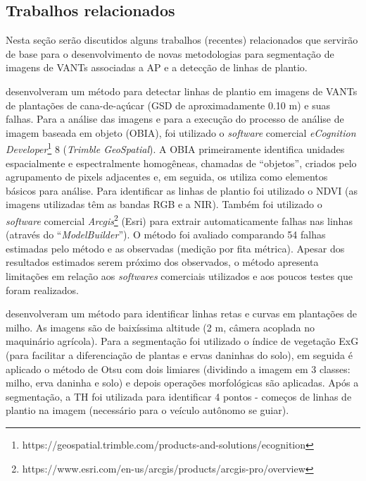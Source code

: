 \documentclass[12pt, a4paper, english, brazil]{article}
\newcommand{\dotsBlue}{\colorbox{orange}{\textcolor{blue}{\dots}}}
\begin{document}


\subsection{Trabalhos relacionados}

Nesta seção serão discutidos alguns trabalhos (recentes) relacionados que servirão de base para o desenvolvimento de novas metodologias para segmentação de imagens de VANTs associadas a AP e a detecção de linhas de plantio.

 desenvolveram um método para detectar linhas de plantio em imagens de VANTs de plantações de cana-de-açúcar (GSD de aproximadamente 0.10 m) e suas falhas. Para a análise das imagens e para a execução do processo de análise de imagem baseada em objeto (OBIA), foi utilizado o \textit{software} comercial \textit{eCognition Developer}\footnote{https://geospatial.trimble.com/products-and-solutions/ecognition} 8 (\textit{Trimble GeoSpatial}). A OBIA primeiramente identifica unidades espacialmente e espectralmente homogêneas, chamadas de ``objetos'', criados pelo agrupamento de pixels adjacentes e, em seguida, os utiliza como elementos básicos para análise. Para identificar as linhas de plantio foi utilizado o NDVI (as imagens utilizadas têm as bandas RGB e a NIR). Também foi utilizado o \textit{software} comercial \textit{Arcgis}\footnote{https://www.esri.com/en-us/arcgis/products/arcgis-pro/overview} (Esri) para extrair automaticamente falhas nas linhas (através do ``\textit{ModelBuilder}''). O método foi avaliado comparando 54 falhas estimadas pelo método e as observadas (medição por fita métrica). Apesar dos resultados estimados serem próximo dos observados, o método apresenta limitações em relação aos \textit{softwares} comerciais utilizados e aos poucos testes que foram realizados.

 desenvolveram um método para identificar linhas retas e curvas em plantações de milho. As imagens são de baixíssima altitude (2 m, câmera acoplada no maquinário agrícola). Para a segmentação foi utilizado o índice de vegetação ExG (para facilitar a diferenciação de plantas e ervas daninhas do solo), em seguida é aplicado o método de Otsu com dois limiares (dividindo a imagem em 3 classes: milho, erva daninha e solo) e depois operações morfológicas são aplicadas. Após a segmentação, a TH foi utilizada para identificar 4 pontos - começos de linhas de plantio na imagem (necessário para o veículo autônomo se guiar).
\end{document}

